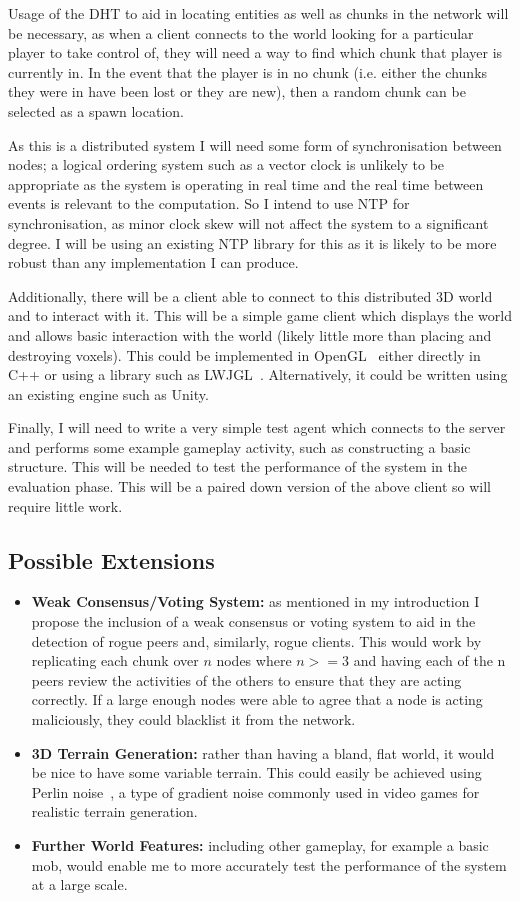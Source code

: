 \documentclass[12pt,a4paper]{article}
\begin{document}
	Usage of the DHT to aid in locating entities as well as chunks in the network will be necessary, as when a client connects to the world looking for a particular player to take control of, they will need a way to find which chunk that player is currently in. In the event that the player is in no chunk (i.e. either the chunks they were in have been lost or they are new), then a random chunk can be selected as a spawn location.
	
	As this is a distributed system I will need some form of synchronisation between nodes; a logical ordering system such as a vector clock is unlikely to be appropriate as the system is operating in real time and the real time between events is relevant to the computation. So I intend to use NTP for synchronisation, as minor clock skew will not affect the system to a significant degree. I will be using an existing NTP library for this as it is likely to be more robust than any implementation I can produce.
	
	Additionally, there will be a client able to connect to this distributed 3D world and to interact with it. This will be a simple game client which displays the world and allows basic interaction with the world (likely little more than placing and destroying voxels). This could be implemented in OpenGL~\cite{opengl} either directly in C++ or using a library such as LWJGL~\cite{lwjgl}. Alternatively, it could be written using an existing engine such as Unity.
	
	Finally, I will need to write a very simple test agent which connects to the server and performs some example gameplay activity, such as constructing a basic structure. This will be needed to test the performance of the system in the evaluation phase. This will be a paired down version of the above client so will require little work.
	
	\subsection{Possible Extensions}
	
	\begin{itemize}
		\item \textbf{Weak Consensus/Voting System:} as mentioned in my introduction I propose the inclusion of a weak consensus or voting system to aid in the detection of rogue peers and, similarly, rogue clients. This would work by replicating each chunk over $n$ nodes where $n>=3$ and having each of the n peers review the activities of the others to ensure that they are acting correctly. If a large enough nodes were able to agree that a node is acting maliciously, they could blacklist it from the network.
		\item \textbf{3D Terrain Generation:} rather than having a bland, flat world, it would be nice to have some variable terrain. This could easily be achieved using Perlin noise~\cite{perlin}, a type of gradient noise commonly used in video games for realistic terrain generation.
		\item \textbf{Further World Features:} including other gameplay, for example a basic mob\cite{mob}, would enable me to more accurately test the performance of the system at a large scale.
	\end{itemize}
	
\end{document}

